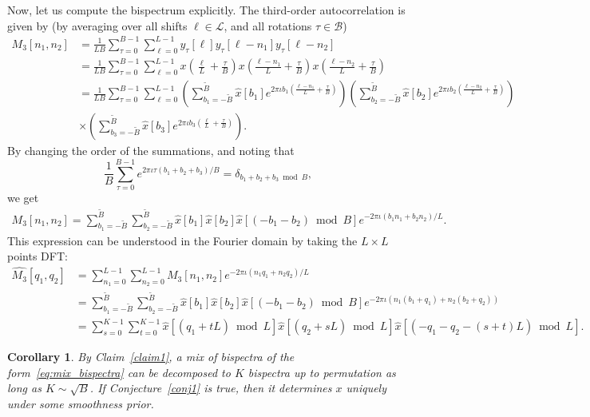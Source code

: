 \documentclass[english,12pt]{article}
\newtheorem{cor}{Corollary}
\newcommand{\I}{\iota}
\newcommand{\tB}{\tilde{B}}
\begin{document}
Now, let us  compute the bispectrum explicitly. The third-order autocorrelation is given by (by averaging over all shifts $\ell\in\mathcal{L}$, and all rotations $\tau\in\mathcal{B}$)
\begin{equation}
\begin{split}
M_3[n_1,n_2] &= \frac{1}{LB}\sum_{\tau=0}^{B-1}\sum_{\ell=0}^{L-1} y_\tau[\ell] y_\tau[\ell-n_1] y_\tau[\ell-n_2]\\ 
&= \frac{1}{LB}\sum_{\tau=0}^{B-1}\sum_{\ell=0}^{L-1} x\left(\frac{\ell}{L} + \frac{\tau}{B}\right) x\left(\frac{\ell-n_1}{L} + \frac{\tau}{B}\right)
x\left(\frac{\ell-n_2}{L} + \frac{\tau}{B}\right)\\
&= \frac{1}{LB}\sum_{\tau=0}^{B-1}\sum_{\ell=0}^{L-1} 
\left(\sum_{b_1=-\tB}^{\tB}\hat{x}[b_1]e^{2\pi\I b_1 \left(\frac{\ell-n_1}{L} + \frac{\tau}{B}\right) }\right) 
\left(\sum_{b_2=-\tB}^{\tB}\hat{x}[b_2]e^{2\pi\I b_2 \left(\frac{\ell-n_2}{L} + \frac{\tau}{B}\right) } \right) \\
&\times \left(\sum_{b_3=-\tB}^{\tB}\hat{x}[b_3]e^{2\pi\I b_3 \left(\frac{\ell}{L} + \frac{\tau}{B}\right) }\right). 
\end{split}
\end{equation}
By changing the order of the summations, and noting that 
\begin{equation} \label{eq:sum}
\frac{1}{B}\sum_{\tau=0}^{B-1}e^{2\pi\I\tau (b_1+b_2+b_3)/B} = \delta_{b_1+b_2+b_3\bmod B},
\end{equation}
we get 
\begin{equation}
\begin{split}
M_3[n_1,n_2] = 
\sum_{b_1=-\tB}^{\tB}\sum_{b_2=-\tB}^{\tB}\hat{x}[b_1]\hat{x}[b_2]\hat{x}[(-b_1-b_2)\bmod B]e^{-2\pi\I (b_1n_1 + b_2n_2)/L}.
\end{split}
\end{equation}
This expression can be understood in the Fourier domain by taking the $L\times L$ points DFT: 
\begin{equation} \label{eq:mix_bispectra}
\begin{split}
\hat{M_3}[q_1,q_2] &= \sum_{n_1=0}^{L-1} \sum_{n_2=0}^{L-1}
M_3[n_1,n_2]e^{-2\pi\I(n_1q_1+n_2q_2)/L} \\ &=  
\sum_{b_1=-\tB}^{\tB}\sum_{b_2=-\tB}^{\tB}\hat{x}[b_1]\hat{x}[b_2]\hat{x}[(-b_1-b_2)\bmod B]e^{-2\pi\I (n_1(b_1+q_1) + n_2(b_2+q_2))} \\ & = \sum_{s=0}^{K-1} \sum_{t=0}^{K-1} \hat{x}[(q_1 + tL)\bmod L] \hat{x}[(q_2 + sL)\bmod L]\hat{x}[(-q_1-q_2 - (s+t)L)\bmod L].
\end{split}
\end{equation}
\begin{cor}
	By Claim~\ref{claim1}, a mix of bispectra of the form~\eqref{eq:mix_bispectra} can be decomposed to $K$ bispectra up to permutation as long as $K\sim\sqrt{B}$. If Conjecture~\ref{conj1} is true, then it determines $x$ uniquely under some smoothness prior.  
\end{cor}
\end{document}
